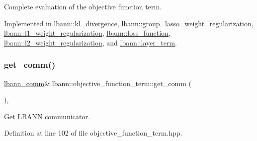 Complete evaluation of the objective function term. 

Implemented in \hyperlink{classlbann_1_1kl__divergence_a93aab2ca89cdaab075a940184ae209d5}{lbann\+::kl\+\_\+divergence}, \hyperlink{classlbann_1_1group__lasso__weight__regularization_a48c46b2e06337e1890b12811182db11b}{lbann\+::group\+\_\+lasso\+\_\+weight\+\_\+regularization}, \hyperlink{classlbann_1_1l1__weight__regularization_a5416b0c884e45854a03e0d2e2b3e63f3}{lbann\+::l1\+\_\+weight\+\_\+regularization}, \hyperlink{classlbann_1_1loss__function_a5264d3e71125b7ce8694f73bf25662f7}{lbann\+::loss\+\_\+function}, \hyperlink{classlbann_1_1l2__weight__regularization_a5517e1fa9da8a28f39cf208054f6138a}{lbann\+::l2\+\_\+weight\+\_\+regularization}, and \hyperlink{classlbann_1_1layer__term_a2b0fdcf6a0dd7bea797b5ef1b4082f70}{lbann\+::layer\+\_\+term}.

\mbox{\label{classlbann_1_1objective__function__term_a5f89b676a26a6b76ddc26563ac87beb9}} 
\subsubsection{\texorpdfstring{get\+\_\+comm()}{get\_comm()}}
{\footnotesize\ttfamily \hyperlink{classlbann_1_1lbann__comm}{lbann\+\_\+comm}\& lbann\+::objective\+\_\+function\+\_\+term\+::get\+\_\+comm (\begin{DoxyParamCaption}{ }\end{DoxyParamCaption})\hspace{0.3cm}{\ttfamily [inline]}, {\ttfamily [protected]}}

Get L\+B\+A\+NN communicator. 

Definition at line 102 of file objective\+\_\+function\+\_\+term.\+hpp.


